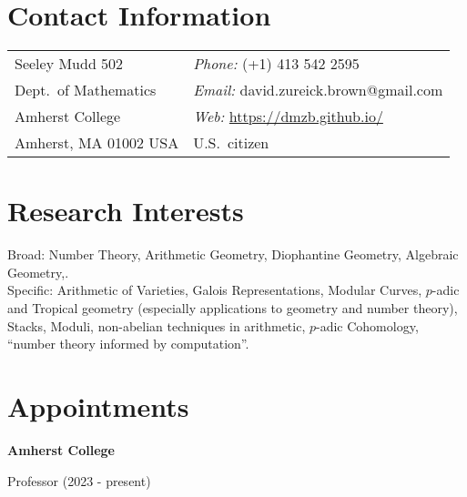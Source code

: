 \documentclass[margin,line]{res}
\newcommand{\defi}[1]{\textsf{#1}} 				%
\newenvironment{list1}{
  \begin{list}{\ding{113}}{%
      \setlength{\itemsep}{0in}
      \setlength{\parsep}{0in} \setlength{\parskip}{0in}
      \setlength{\topsep}{0in} \setlength{\partopsep}{0in}
      \setlength{\leftmargin}{0.17in}}}{\end{list}}
\begin{document}

\begin{resume}
\section{\sc Contact Information}
\vspace{.05in}
\begin{tabular}{@{}p{3in}p{4in}}
Seeley Mudd 502                            & \emph{Phone:} (+1) 413 542 2595 \\
Dept.~of Mathematics          & \emph{Email:} david.zureick.brown@gmail.com\\
Amherst College   & \emph{Web:} \url{https://dmzb.github.io/} \\
Amherst, MA 01002 USA               & U.S.~citizen
\end{tabular}



\section{\sc Research Interests}
 \defi{Broad}: Number Theory, Arithmetic Geometry, Diophantine Geometry, Algebraic Geometry,.\\
 \defi{Specific}: Arithmetic of Varieties, Galois Representations, Modular Curves, $p$-adic and Tropical geometry (especially applications to geometry and number theory), Stacks, Moduli, non-abelian techniques in arithmetic, $p$-adic Cohomology, ``number theory informed by computation''.

\section{\sc Appointments}

{\bf Amherst College } \\
  \vspace*{-.15in}
  \begin{list1}
  \item[] Professor (2023 - present)


  \end{list1}
\vspace{-7pt}


\end{resume}
\end{document}
